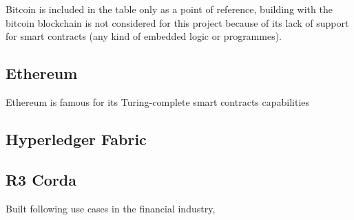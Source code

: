 Bitcoin is included in the table only as a point of reference, building with the bitcoin 
blockchain is not considered for this project because of its lack of support for smart 
contracts (any kind of embedded logic or programmes).

\subsection*{Ethereum}

Ethereum is famous for its Turing-complete smart contracts capabilities

\subsection*{Hyperledger Fabric}

\subsection*{R3 Corda}
Built following use cases in the financial industry, 
